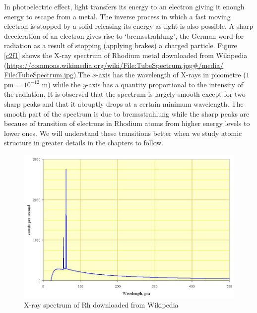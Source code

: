 In photoelectric effect, light transfers its energy to an electron giving it
enough energy to escape from a metal. The inverse process in which a fast moving
electron is stopped by a solid releasing its energy as light is also possible.
A sharp deceleration of an electron gives rise to `bremsstrahlung', the German
word for radiation as a result of stopping (applying brakes) a charged particle.
Figure \ref{c2f1} shows the X-ray spectrum of Rhodium metal downloaded from
Wikipedia (\url{https://commons.wikimedia.org/wiki/File:TubeSpectrum.jpg#/media/
File:TubeSpectrum.jpg}).The $x$-axis has the wavelength of X-rays in picometre
($1$ pm = $10^{-12}$ m) while the $y$-axis has a quantity proportional to the
intensity of the radiation. It is observed that the spectrum is largely smooth
except for two sharp peaks and that it abruptly drops at a certain minimum
wavelength. The smooth part of the spectrum is due to bremsstrahlung while the
sharp peaks are because of transition of electrons in Rhodium atoms from higher 
energy levels to lower ones. We will understand these transitions better when we
study atomic structure in greater details in the chapters to follow.
\begin{figure}
\includegraphics[scale=0.5]{Tubespectrum}
\caption{X-ray spectrum of Rh downloaded from Wikipedia}\label{c2f2}
\end{figure}

